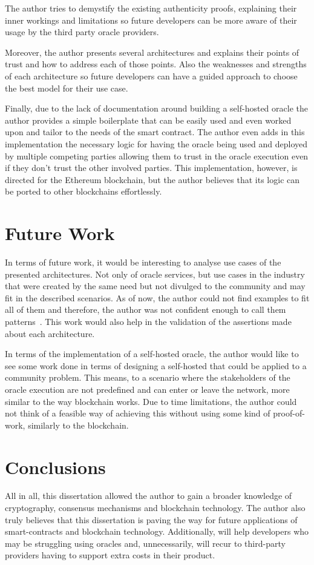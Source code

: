 The author tries to demystify the existing authenticity proofs, explaining their inner workings and limitations so future developers can be more aware of their usage by the third party oracle providers.

Moreover, the author presents several architectures and explains their points of trust and how to address each of those points. Also the weaknesses and strengths of each architecture so future developers can have a guided approach to choose the best model for their use case.

Finally, due to the lack of documentation around building a self-hosted oracle the author provides a simple boilerplate that can be easily used and even worked upon and tailor to the needs of the smart contract. The author even adds in this implementation the necessary logic for having the oracle being used and deployed by multiple competing parties allowing them to trust in the oracle execution even if they don't trust the other involved parties. This implementation, however, is directed for the Ethereum blockchain, but the author believes that its logic can be ported to other blockchains effortlessly.

\section{Future Work}

In terms of future work, it would be interesting to analyse use cases of the presented architectures. Not only of oracle services, but use cases in the industry that were created by the same need but not divulged to the community and may fit in the described scenarios. As of now, the author could not find examples to fit all of them and therefore, the author was not confident enough to call them patterns~\citet{Alexander,Gamma1995}. This work would also help in the validation of the assertions made about each architecture.

In terms of the implementation of a self-hosted oracle, the author would like to see some work done in terms of designing a self-hosted that could be applied to a community problem. This means, to a scenario where the stakeholders of the oracle execution are not predefined and can enter or leave the network, more similar to the way blockchain works. Due to time limitations, the author could not think of a feasible way of achieving this without using some kind of proof-of-work, similarly to the blockchain.


\section{Conclusions}

All in all, this dissertation allowed the author to gain a broader knowledge of cryptography, consensus mechanisms and blockchain technology. The author also truly believes that this dissertation is paving the way for future applications of smart-contracts and blockchain technology. Additionally, will help developers who may be struggling using oracles and, unnecessarily, will recur to third-party providers having to support extra costs in their product.